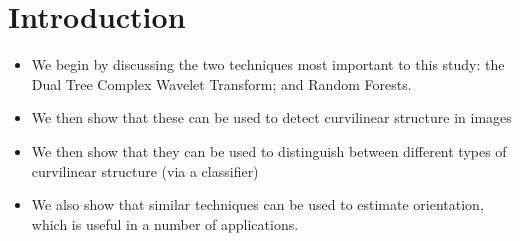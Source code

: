 \documentclass[a4paper]{report}
\title{\ttl}
\author{Authors}
\begin{document}
\maketitle

\begin{abstract}
Estimating orientation of image structure underpins applications including digital mammography, retinography and fingerprint analysis. We consider different choices of filter bank including those based on first and second derivatives, efficient Haar-like features and the Dual Tree Complex Wavelet Transform. We then investigate how standard regressors (linear regression, Boosting and Random Forests) may be adapted to use the responses to these filter banks in order to predict orientation of image structure. For a quantitative evaluation, we use synthetic images based on mammograms and the publicly available DRIVE database of retinal images, and show that Random Forests and the wavelet transform offer superior accuracy though at a cost in efficiency. Qualitative results are also presented for real mammograms and fingerprint images.
\end{abstract}

\section{Introduction}
\begin{itemize}
\item We begin by discussing the two techniques most important to this study: the Dual Tree Complex Wavelet Transform; and Random Forests.

\item We then show that these can be used to detect curvilinear structure in images

\item We then show that they can be used to distinguish between different types of curvilinear structure (via a classifier)

\item We also show that similar techniques can be used to estimate orientation, which is useful in a number of applications.
\end{itemize}

\end{document}
